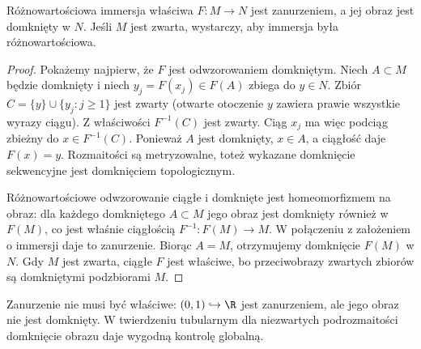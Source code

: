 \begin{stwierdzenie}
\label{prop:proper-immersja}
Różnowartościowa immersja właściwa $F:M\to N$
jest zanurzeniem, a jej obraz jest domknięty w $N$.
Jeśli $M$ jest zwarta, wystarczy, aby immersja
była różnowartościowa.
\end{stwierdzenie}
\begin{proof}
Pokażemy najpierw, że $F$ jest odwzorowaniem
domkniętym. Niech $A\subset M$ będzie domknięty
i niech $y_j=F(x_j)\in F(A)$ zbiega do $y\in N$.
Zbiór $C=\{y\}\cup\{y_j:j\geq1\}$ jest zwarty
(otwarte otoczenie $y$ zawiera prawie wszystkie
wyrazy ciągu). Z właściwości $F^{-1}(C)$ jest
zwarty. Ciąg $x_j$ ma więc podciąg zbieżny
do $x\in F^{-1}(C)$. Ponieważ $A$ jest domknięty,
$x\in A$, a ciągłość daje $F(x)=y$. Rozmaitości
są metryzowalne, toteż wykazane domknięcie
sekwencyjne jest domknięciem topologicznym.

Różnowartościowe odwzorowanie ciągłe i domknięte
jest homeomorfizmem na obraz: dla każdego
domkniętego $A\subset M$ jego obraz jest
domknięty również w $F(M)$, co jest właśnie
ciągłością $F^{-1}:F(M)\to M$. W połączeniu
z założeniem o immersji daje to zanurzenie.
Biorąc $A=M$, otrzymujemy domknięcie $F(M)$
w $N$. Gdy $M$ jest zwarta, ciągłe $F$
jest właściwe, bo przeciwobrazy zwartych
zbiorów są domkniętymi podzbiorami $M$.
\end{proof}

\begin{uwaga}
Zanurzenie nie musi być właściwe:
$(0,1)\hookrightarrow\R$ jest zanurzeniem,
ale jego obraz nie jest domknięty.
W twierdzeniu tubularnym dla niezwartych
podrozmaitości domknięcie obrazu daje wygodną
kontrolę globalną.
\end{uwaga}

